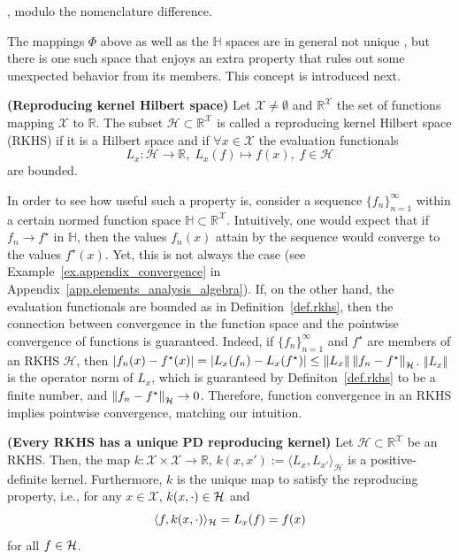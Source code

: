 \begin{my_proof}
	\cite[Theorem~4.16]{steinwart2008svm_book}, modulo the nomenclature difference.
\end{my_proof}

The mappings $\Phi$ above as well as the $\mathbb{H}$ spaces are in general not unique \citep[§4]{steinwart2008svm_book}, but there is one such space that enjoys an extra property that rules out some unexpected behavior from its members. This concept is introduced next.

\begin{definition}
	\label{def.rkhs}
	\textbf{(Reproducing kernel Hilbert space)} 
	Let $\mathcal{X} \neq \emptyset$ and $\mathbb{R}^\mathcal{X}$ the set of functions mapping $\mathcal{X}$ to $\mathbb{R}$. The subset $\mathcal{H} \subset \mathbb{R}^\mathcal{X}$ is called a reproducing kernel Hilbert space (RKHS) if it is a Hilbert space and if $\forall x \in \mathcal{X}$ the evaluation functionals
	\begin{equation}
		L_x: \mathcal{H} \rightarrow \mathbb{R}, \; L_x(f) \mapsto f(x), \; f\in \mathcal{H}
	\end{equation}
	are bounded.
\end{definition}

In order to see how useful such a property is, consider a sequence $\{f_n\}_{n=1}^\infty$ within a certain normed function space $\mathbb{H} \subset \mathbb{R}^\mathcal{X}$. Intuitively, one would expect that if $f_n \rightarrow f^\star$ in $\mathbb{H}$, then the values $f_n(x)$ attain by the sequence would converge to the values $f^\star(x)$. Yet, this is not always the case (see Example~\ref{ex.appendix_convergence} in Appendix~\ref{app.elements_analysis_algebra}). If, on the other hand, the evaluation functionals are bounded as in Definition~\ref{def.rkhs}, then the connection between convergence in the function space and the pointwise convergence of functions is guaranteed. Indeed, if $\{f_n\}_{n=1}^\infty$ and $f^\star$ are members of an RKHS $\mathcal{H}$, then $|f_n(x)-f^\star(x)| = | L_x(f_n) - L_x(f^\star)|  \leq \Vert L_x \Vert \left\| f_n - f^\star \right\|_\mathcal{H}$. $\Vert L_x \Vert $ is the operator norm of $L_x$, which is guaranteed by Definiton~\ref{def.rkhs} to be a finite number, and $\left\| f_n - f^\star \right\|_\mathcal{H} \rightarrow 0$. Therefore, function convergence in an RKHS implies pointwise convergence, matching our intuition.

\begin{proposition}
	\label{prop.unique_reprod_kernel}
	\textbf{(Every RKHS has a unique PD reproducing kernel)} 
	Let $\mathcal{H} \subset \mathbb{R}^\mathcal{X}$ be an RKHS. Then, the map $k: \mathcal{X} \times \mathcal{X} \rightarrow \mathbb{R}$, $k(x,x') := \langle L_x, L_{x'} \rangle_\mathcal{H}$ is a positive-definite kernel. Furthermore, $k$ is the unique map to satisfy the reproducing property, i.e., for any $x \in \mathcal{X}$, $k(x,\cdot) \in \mathcal{H}$ and
	\begin{equation}
		\langle f, k(x,\cdot) \rangle_\mathcal{H} = L_x(f) = f(x)
	\end{equation} 
	for  all $f \in \mathcal{H}$.
\end{proposition}

